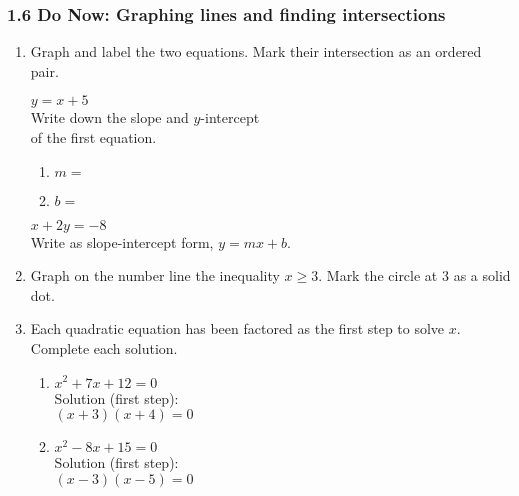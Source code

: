 \documentclass[12pt, twoside]{article}
\begin{document}
\subsubsection*{1.6 Do Now: Graphing lines and finding intersections}
\begin{enumerate}
  \item Graph and label the two equations. Mark their intersection as an ordered pair.

  \begin{multicols}{2}
    $y = x+5$ \\[0.25cm]
    Write down the slope and $y$-intercept\\ of the first equation.
    \begin{enumerate}
      \item $m=$ \bigskip
      \item $b=$
    \end{enumerate}
    \columnbreak
    $x+2y = -8$ \\[0.5cm]
        Write as slope-intercept form, $y=mx+b$.
    \end{multicols}

  \begin{center} %
  \end{center}

  \item Graph on the number line the inequality $x \geq 3$. Mark the circle at 3 as a solid dot. \vspace{0.5cm}
    \begin{center}
      \end{center}

\newpage
\item Each quadratic equation has been factored as the first step to solve $x$. Complete each solution.
\begin{multicols}{2}
  \begin{enumerate}[itemsep=5cm]
    \item $x^2 + 7x + 12 = 0$ \\[0.5cm]
      Solution (first step): \\
      $(x + 3)(x + 4) = 0$
    \item $x^2 - 8x + 15 = 0$ \\[0.5cm]
      Solution (first step): \\
      $(x - 3)(x - 5) = 0$
    \end{enumerate}
    \end{multicols} \vspace{2cm}


\end{enumerate}
\end{document}
